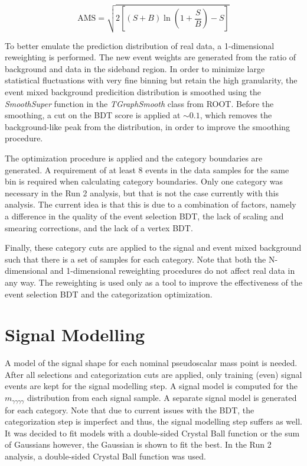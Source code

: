 \documentclass[12pt]{article}
\begin{document}
\begin{equation} \label{eqn:ams}
\text{AMS} = \sqrt{2 \left[ (S + B) \ln \left(1 + \frac{S}{B}\right) - S \right]}
\end{equation}

To better emulate the prediction distribution of real data, a 1-dimensional reweighting is performed. The new event weights are generated from the ratio of background and data in the sideband region. In order to minimize large statistical fluctuations with very fine binning but retain the high granularity, the event mixed background predicition distribution is smoothed using the \textit{SmoothSuper} function in the \textit{TGraphSmooth} class from ROOT. Before the smoothing, a cut on the BDT score is applied at $\sim 0.1$, which removes the background-like peak from the distribution, in order to improve the smoothing procedure.\par

The optimization procedure is applied and the category boundaries are generated. A requirement of at least 8 events in the data samples for the same bin is required when calculating category boundaries. Only one category was necessary in the Run 2 analysis, but that is not the case currently with this analysis. The current idea is that this is due to a combination of factors, namely a difference in the quality of the event selection BDT, the lack of scaling and smearing corrections, and the lack of a vertex BDT.\par

Finally, these category cuts are applied to the signal and event mixed background such that there is a set of samples for each category. Note that both the N-dimensional and 1-dimensional reweighting procedures do not affect real data in any way. The reweighting is used only as a tool to improve the effectiveness of the event selection BDT and the categorization optimization.\par


\section{Signal Modelling}
A model of the signal shape for each nominal pseudoscalar mass point is needed. After all selections and categorization cuts are applied, only training (even) signal events are kept for the signal modelling step. A signal model is computed for the $m_{\gamma \gamma \gamma \gamma}$ distribution from each signal sample. A separate signal model is generated for each category. Note that due to current issues with the BDT, the categorization step is imperfect and thus, the signal modelling step suffers as well. It was decided to fit models with a double-sided Crystal Ball function or the sum of Gaussians however, the Gaussian is shown to fit the best. In the Run 2 analysis, a double-sided Crystal Ball function was used.\par
\end{document}
